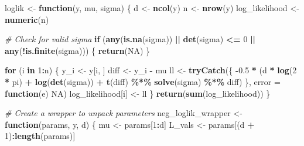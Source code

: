 \documentclass[
]{article}
\newenvironment{Shaded}{\begin{snugshade}}{\end{snugshade}}
\newcommand{\AttributeTok}[1]{\textcolor[rgb]{0.13,0.29,0.53}{#1}}
\newcommand{\CommentTok}[1]{\textcolor[rgb]{0.56,0.35,0.01}{\textit{#1}}}
\newcommand{\ConstantTok}[1]{\textcolor[rgb]{0.56,0.35,0.01}{#1}}
\newcommand{\ControlFlowTok}[1]{\textcolor[rgb]{0.13,0.29,0.53}{\textbf{#1}}}
\newcommand{\DecValTok}[1]{\textcolor[rgb]{0.00,0.00,0.81}{#1}}
\newcommand{\FloatTok}[1]{\textcolor[rgb]{0.00,0.00,0.81}{#1}}
\newcommand{\FunctionTok}[1]{\textcolor[rgb]{0.13,0.29,0.53}{\textbf{#1}}}
\newcommand{\NormalTok}[1]{#1}
\newcommand{\OtherTok}[1]{\textcolor[rgb]{0.56,0.35,0.01}{#1}}
\newcommand{\SpecialCharTok}[1]{\textcolor[rgb]{0.81,0.36,0.00}{\textbf{#1}}}
\begin{document}
\begin{Shaded}
\begin{Highlighting}[]
\NormalTok{loglik }\OtherTok{\textless{}{-}} \ControlFlowTok{function}\NormalTok{(y, mu, sigma) \{}
\NormalTok{  d }\OtherTok{\textless{}{-}} \FunctionTok{ncol}\NormalTok{(y)}
\NormalTok{  n }\OtherTok{\textless{}{-}} \FunctionTok{nrow}\NormalTok{(y)}
\NormalTok{  log\_likelihood }\OtherTok{\textless{}{-}} \FunctionTok{numeric}\NormalTok{(n)}

  \CommentTok{\# Check for valid sigma}
  \ControlFlowTok{if}\NormalTok{ (}\FunctionTok{any}\NormalTok{(}\FunctionTok{is.na}\NormalTok{(sigma)) }\SpecialCharTok{||} \FunctionTok{det}\NormalTok{(sigma) }\SpecialCharTok{\textless{}=} \DecValTok{0} \SpecialCharTok{||} \FunctionTok{any}\NormalTok{(}\SpecialCharTok{!}\FunctionTok{is.finite}\NormalTok{(sigma))) \{}
    \FunctionTok{return}\NormalTok{(}\ConstantTok{NA}\NormalTok{)}
\NormalTok{  \}}

  \ControlFlowTok{for}\NormalTok{ (i }\ControlFlowTok{in} \DecValTok{1}\SpecialCharTok{:}\NormalTok{n) \{}
\NormalTok{    y\_i }\OtherTok{\textless{}{-}}\NormalTok{ y[i, ]}
\NormalTok{    diff }\OtherTok{\textless{}{-}}\NormalTok{ y\_i }\SpecialCharTok{{-}}\NormalTok{ mu}
\NormalTok{    ll }\OtherTok{\textless{}{-}} \FunctionTok{tryCatch}\NormalTok{(\{}
      \SpecialCharTok{{-}}\FloatTok{0.5} \SpecialCharTok{*}\NormalTok{ (d }\SpecialCharTok{*} \FunctionTok{log}\NormalTok{(}\DecValTok{2} \SpecialCharTok{*}\NormalTok{ pi) }\SpecialCharTok{+} \FunctionTok{log}\NormalTok{(}\FunctionTok{det}\NormalTok{(sigma)) }\SpecialCharTok{+}
              \FunctionTok{t}\NormalTok{(diff) }\SpecialCharTok{\%*\%} \FunctionTok{solve}\NormalTok{(sigma) }\SpecialCharTok{\%*\%}\NormalTok{ diff)}
\NormalTok{    \}, }\AttributeTok{error =} \ControlFlowTok{function}\NormalTok{(e) }\ConstantTok{NA}\NormalTok{)}
\NormalTok{    log\_likelihood[i] }\OtherTok{\textless{}{-}}\NormalTok{ ll}
\NormalTok{  \}}
  \FunctionTok{return}\NormalTok{(}\FunctionTok{sum}\NormalTok{(log\_likelihood))}
\NormalTok{\}}

\CommentTok{\# Create a wrapper to unpack parameters}
\NormalTok{neg\_loglik\_wrapper }\OtherTok{\textless{}{-}} \ControlFlowTok{function}\NormalTok{(params, y, d) \{}
\NormalTok{  mu }\OtherTok{\textless{}{-}}\NormalTok{ params[}\DecValTok{1}\SpecialCharTok{:}\NormalTok{d]}
\NormalTok{  L\_vals }\OtherTok{\textless{}{-}}\NormalTok{ params[(d }\SpecialCharTok{+} \DecValTok{1}\NormalTok{)}\SpecialCharTok{:}\FunctionTok{length}\NormalTok{(params)]}
  

\end{Highlighting}
\end{Shaded}
\end{document}

